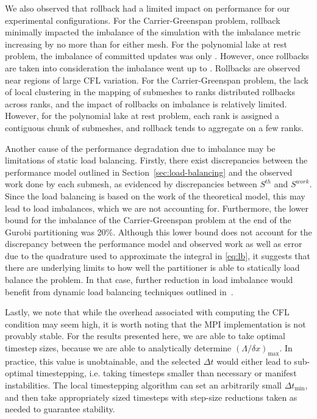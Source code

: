 We also observed that rollback had a limited impact on performance for our experimental configurations.  For the Carrier-Greenspan problem, rollback minimally impacted the imbalance of the simulation with the imbalance metric increasing by no more than \imbCGdtRb{} for either mesh. For the polynomial lake at rest problem, the imbalance of committed updates was only \polynomialImb . However, once rollbacks are taken into consideration the imbalance went up to \polynomialImbwRb . Rollbacks are observed near regions of large CFL variation. For the Carrier-Greenspan problem, the lack of local clustering in the mapping of submeshes to ranks distributed rollbacks across ranks, and the impact of rollbacks on imbalance is relatively limited. However, for the polynomial lake at rest problem, each rank is assigned a contiguous chunk of submeshes, and rollback tends to aggregate on a few ranks.

Another cause of the performance degradation due to imbalance may be limitations of static load balancing. Firstly, there exist discrepancies between the performance model outlined in Section~\ref{sec:load-balancing} and the observed work done by each submesh, as evidenced by discrepancies between $S^{th}$ and $S^{work}$. Since the load balancing is based on the work of the theoretical model, this may lead to load imbalances, which we are not accounting for. Furthermore, the lower bound for the imbalance of the Carrier-Greenspan problem at the end of the Gurobi partitioning was 20\%. Although this lower bound does not account for the discrepancy between the performance model and observed work as well as error due to the quadrature used to approximate the integral in \eqref{eq:lb}, it suggests that there are underlying limits to how well the partitioner is able to statically load balance the problem. In that case, further reduction in load imbalance would benefit from dynamic load balancing techniques outlined in~\cite{Bremer2018}.

Lastly, we note that while the overhead associated with computing the CFL condition may seem high, it is worth noting that the MPI implementation is not provably stable. For the results presented here, we are able to take optimal timestep sizes, because we are able to analytically determine $(\Lambda / \delta x)_{\max}$. In practice, this value is unobtainable, and the selected $\Delta t$ would either lead to sub-optimal timestepping, i.e. taking timesteps smaller than necessary or manifest instabilities. The local timestepping algorithm can set an arbitrarily small $\Delta t_{\min}$,  and then take appropriately sized timesteps with step-size reductions taken as needed to guarantee stability.
